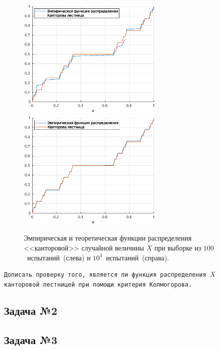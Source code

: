 \begin{figure}[h]
        \hfill
        \includegraphics[width=70mm]{task_02/cantor-100.eps}
        \hfill
        \hfill
        \includegraphics[width=70mm]{task_02/cantor-10000.eps}
        \hfill
        \caption{Эмпирическая и теоретическая функции распределения <<канторовой>> случайной величины $X$ при выборке из $100$~испытаний~(слева) и $10^4$~испытаний~(справа).}
\end{figure}

\texttt{Дописать проверку того, является ли функция распределения $X$ канторовой лестницей при помощи критерия Колмогорова.}

\subsection{Задача №2}

\subsection{Задача №3}

